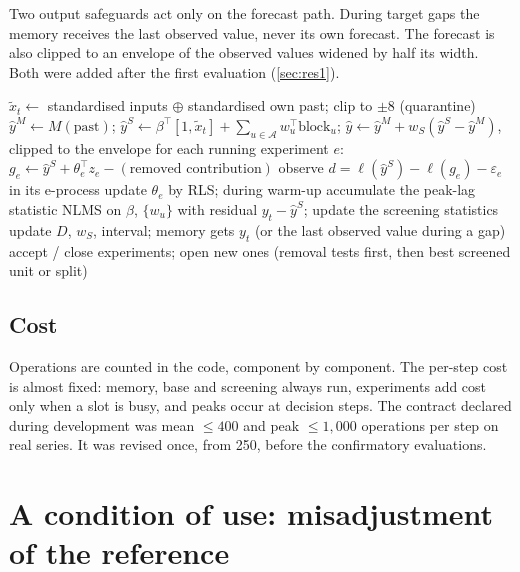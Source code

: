 \documentclass[11pt]{article}
\theoremstyle{remark}
\begin{document}
Two output safeguards act only on the forecast path. During target gaps the memory receives the last observed value, never its own forecast. The forecast is also clipped to an envelope of the observed values widened by half its width. Both were added after the first evaluation (\cref{sec:res1}).

\begin{algorithm}[t]
\caption{One step of LEBRE (simplified; full pseudocode and constants in the research record)}\label{alg:step}
\small
\begin{algorithmic}[1]
\State $\tilde x_t\gets$ standardised inputs $\oplus$ standardised own past; clip to $\pm 8$ (quarantine)
\State $\hat y^M\gets M(\text{past})$; \quad $\hat y^S\gets \beta^\top[1,\tilde x_t]+\sum_{u\in\mathcal A} w_u^\top\mathrm{block}_u$; \quad $\hat y\gets \hat y^M+w_S(\hat y^S-\hat y^M)$, clipped to the envelope
\State for each running experiment $e$: $g_e\gets\hat y^S+\theta_e^\top z_e-(\text{removed contribution})$ 
     observe $d=\ell(\hat y^S)-\ell(g_e)-\varepsilon_e$ in its e-process \EndIf
    \State update $\theta_e$ by RLS; during warm-up accumulate the peak-lag statistic
  \EndFor
  \State NLMS on $\beta$, $\{w_u\}$ with residual $y_t-\hat y^S$; update the screening statistics
\EndIf
\State update $D$, $w_S$, interval; memory gets $y_t$ (or the last observed value during a gap)
 accept / close experiments; open new ones (removal tests first, then best screened unit or split) \EndIf
\end{algorithmic}
\end{algorithm}

\subsection{Cost}
Operations are counted in the code, component by component. The per-step cost is almost fixed: memory, base and screening always run, experiments add cost only when a slot is busy, and peaks occur at decision steps. The contract declared during development was mean $\le 400$ and peak $\le 1{,}000$ operations per step on real series. It was revised once, from 250, before the confirmatory evaluations.

\section{A condition of use: misadjustment of the reference}\label{sec:theory}
\end{document}
